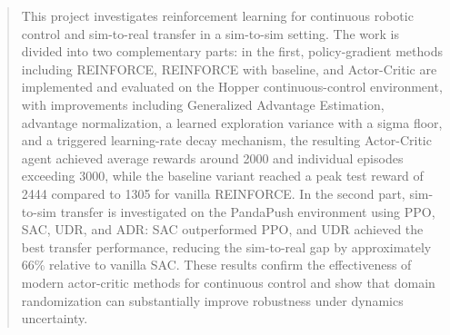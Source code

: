 \begin{abstract}
This project investigates reinforcement learning for continuous robotic 
control and sim-to-real transfer in a sim-to-sim setting. The work is 
divided into two complementary parts: in the first, policy-gradient methods 
including REINFORCE, REINFORCE with baseline, and Actor-Critic are implemented 
and evaluated on the Hopper continuous-control environment, with improvements 
including Generalized Advantage Estimation, advantage normalization, a learned 
exploration variance with a sigma floor, and a triggered learning-rate decay 
mechanism, the resulting Actor-Critic agent achieved average rewards around 
2000 and individual episodes exceeding 3000, while the baseline variant reached 
a peak test reward of 2444 compared to 1305 for vanilla REINFORCE. In the 
second part, sim-to-sim transfer is investigated on the PandaPush environment 
using PPO, SAC, UDR, and ADR: SAC outperformed PPO, and UDR achieved the best 
transfer performance, reducing the sim-to-real gap by approximately 66\% 
relative to vanilla SAC. These results confirm the effectiveness of modern 
actor-critic methods for continuous control and show that domain randomization 
can substantially improve robustness under dynamics uncertainty.
\end{abstract}
